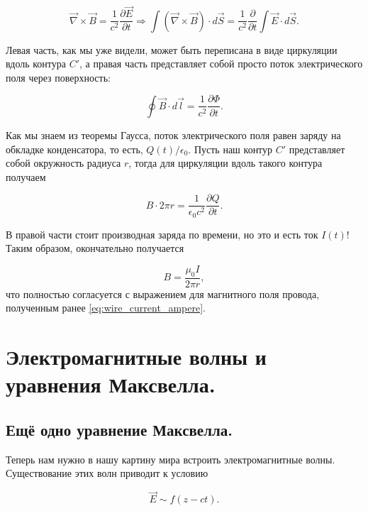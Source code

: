 \documentclass[a4paper,12pt]{article}
\numberwithin{equation}{section}
\newcommand{\pt}{\partial}
\newcommand{\eps}{\epsilon}
\newcommand{\vn}{\vec{\nabla}}
\begin{document}
\begin{equation}
  \label{eq:displacement_cur_1}
  \vn \times \vec{B} = \frac{1}{c^2} \frac{\pt \vec{E}}{\pt t}
  \Rightarrow \int \left( \vn \times \vec{B}  \right)  \cdot d \vec{S}
  = \frac{1}{c^2} \frac{\pt}{\pt t} \int \vec{E} \cdot d \vec{S}.
\end{equation}

Левая часть, как мы уже видели, может быть переписана в виде
циркуляции вдоль контура $C'$, а правая часть представляет собой
просто поток электрического поля через поверхность: 

\begin{equation}
  \label{eq:displacement_cur_2}
  \oint \vec{B} \cdot d \vec{l} = \frac{1}{c^2} \frac{\pt \Phi}{\pt t}.
\end{equation}

Как мы знаем из теоремы Гаусса, поток электрического поля равен заряду
на обкладке конденсатора, то есть, $Q(t)/\eps_0$. Пусть наш контур
$C'$ представляет собой окружность радиуса $r$, тогда для циркуляции
вдоль такого контура получаем

\begin{equation}
  \label{eq:displacement_cur_3}
  B \cdot 2 \pi r = \frac{1}{\eps_0c^2} \frac{\pt Q}{\pt t}. 
\end{equation}

В правой части стоит производная заряда по времени, но это и есть ток
$I(t)$! Таким образом, окончательно получается

\begin{equation}
  \label{eq:displacement_cur_4}
  B = \frac{\mu_0 I }{2\pi r},
\end{equation}
что полностью согласуется с выражением для магнитного поля провода,
полученным ранее \eqref{eq:wire_current_ampere}.

\section{Электромагнитные волны  и уравнения Максвелла. }
\label{sec:em_waves}

\subsection{Ещё одно уравнение Максвелла.}
\label{sec:maxwell_eq_4}

Теперь нам нужно в нашу картину мира встроить электромагнитные
волны. Существование этих волн приводит к условию

\begin{equation}
  \label{eq:waves_z_dir}
  \vec{E} \sim f (z-ct).
\end{equation}
\end{document}
